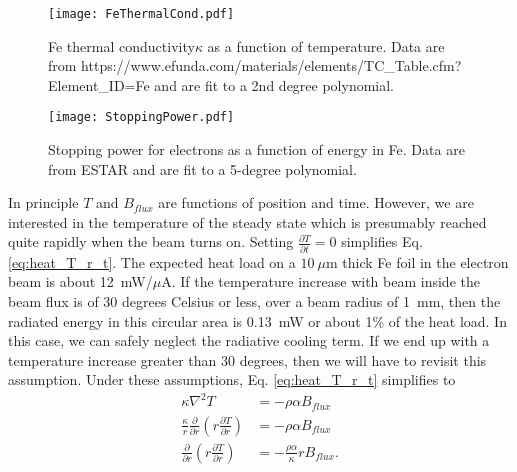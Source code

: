 \documentclass[12pt]{article}
\begin{document}
\begin{figure}[h]
\centering
\texttt{[image: FeThermalCond.pdf]}
\caption{\label{fig:conductivity} Fe thermal conductivity$\kappa$ as a function of temperature. Data are from https://www.efunda.com/materials/elements/TC\_Table.cfm?Element\_ID=Fe and are fit to a 2nd degree polynomial.}
\end{figure}
\begin{figure}[h]
\centering
\texttt{[image: StoppingPower.pdf]}
\caption{\label{fig:stopping}Stopping power for electrons as a function of energy in Fe. Data are from ESTAR and are fit to a 5-degree polynomial.}
\end{figure}
In principle $T$ and $B_{flux}$ are functions of position and time. However, we are interested in the temperature of the steady state which is presumably reached quite rapidly when the beam turns on. Setting $\frac{\partial T}{\partial t}=0$ simplifies Eq. \ref{eq:heat_T_r_t}. The expected heat load on a $10~\mu$m thick Fe foil in the electron beam is about 12~mW/$\mu$A. If the temperature increase with beam inside the beam flux is of 30 degrees Celsius or less, over a beam radius of 1~mm, then the radiated energy in this circular area is 0.13~mW or about 1\% of the heat load. In this case, we can safely neglect the radiative cooling term. If we end up with a temperature increase greater than 30 degrees, then we will have to revisit this assumption. Under these assumptions, Eq. \ref{eq:heat_T_r_t} simplifies to  
\begin{align}
\kappa\nabla^2T&=-\rho\alpha B_{flux}\\
\frac{\kappa}{r}\frac{\partial}{\partial r}\left(r\frac{\partial T}{\partial r}\right)&=-\rho\alpha B_{flux}\\
\label{eq:heat_T_r}
\frac{\partial}{\partial r}\left(r\frac{\partial T}{\partial r}\right)&=-\frac{\rho\alpha}{\kappa}rB_{flux}.
\end{align}
\end{document}
